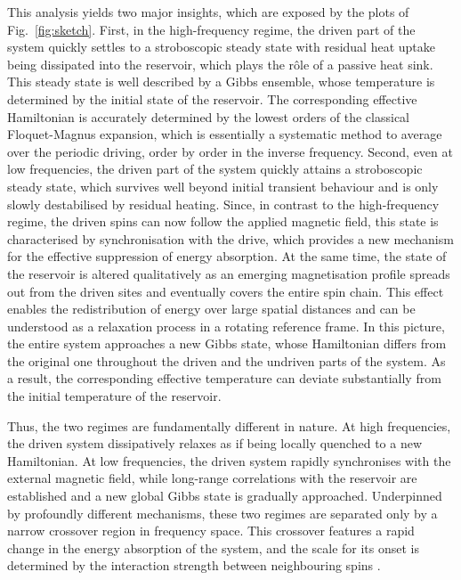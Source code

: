 \documentclass[aps,pre,twocolumn,notitlepage,floats,10pt]{revtex4-1}
\begin{document}
This analysis yields two major insights, which are exposed by the plots of
Fig.~\ref{fig:sketch}.
First, in the high-frequency regime, the driven part of the system quickly
settles to a stroboscopic steady state with residual heat uptake being
dissipated into the reservoir, which plays the r\^{o}le of a passive heat sink.
This steady state is well described by a Gibbs ensemble, whose temperature is
determined by the initial state of the reservoir.
The corresponding effective Hamiltonian is accurately determined by the lowest
orders of the classical Floquet-Magnus expansion, which is essentially a
systematic method to average over the periodic driving, order by order in the
inverse frequency.
Second, even at low frequencies, the driven part of the system quickly attains a
stroboscopic steady state, which survives well beyond initial transient behaviour
and is only slowly destabilised by residual heating.
Since, in contrast to the high-frequency regime, the driven spins can now follow
the applied magnetic field, this state is characterised by synchronisation with
the drive, which provides a new mechanism for the effective suppression of
energy absorption.
At the same time, the state of the reservoir is altered qualitatively as an
emerging magnetisation profile spreads out from the driven sites and eventually
covers the entire spin chain. 
This effect enables the redistribution of energy over large spatial distances
and can be understood as a relaxation process in a rotating reference frame.
In this picture, the entire system approaches a new Gibbs state, whose
Hamiltonian differs from the original one throughout the driven and the undriven
parts of the system.
As a result, the corresponding effective temperature can deviate substantially
from the initial temperature of the reservoir.

Thus, the two regimes are fundamentally different in nature.
At high frequencies, the driven system dissipatively relaxes as if being
locally quenched to a new Hamiltonian.
At low frequencies, the driven system rapidly synchronises with the external
magnetic field, while long-range correlations with the reservoir are established
and a new global Gibbs state is gradually approached.
Underpinned by profoundly different mechanisms, these two regimes are separated
only by a narrow crossover region in frequency space. 
This crossover features a rapid change in the energy absorption of the system,
and the scale for its onset is determined by the interaction strength between
neighbouring spins \cite{short-paper}.
\end{document}
